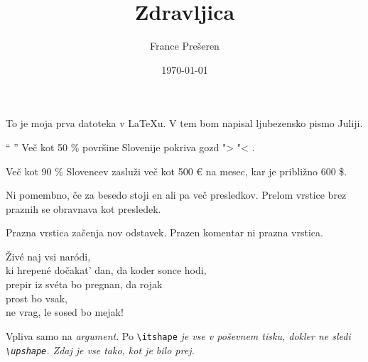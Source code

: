 \documentclass[12pt]{article}
\author{France Prešeren}
\title{Zdravljica}
\date{\today}
\begin{document}
  \maketitle
  To je moja prva datoteka v LaTeXu. V tem bom napisal ljubezensko pismo Juliji.
  
  \vspace{2cm}

  "` "' Več kot 50 \% površine Slovenije pokriva gozd "> "< .

  \glqq \grqq

  \vspace{2cm}


  Več kot 90 \% Slovencev zasluži več kot 500 € na mesec, kar je približno 600 \$.

  \vspace{2cm}

  Ni pomembno, če za besedo
  stoji en ali pa več           presledkov.
  Prelom vrstice brez praznih 
        se obravnava kot presledek.


  Prazna vrstica začenja nov odstavek. 
  Prazen komentar ni prazna vrstica.

\clearpage

\noindent Živé naj vsi naródi,\\
ki hrepené dočakat' dan,\newline
da koder sonce hodi,\\
prepir iz svéta bo pregnan,\newline
da rojak\\
prost bo vsak,\\
ne vrag, le sosed bo mejak!

\vspace{2cm}
Vpliva samo na \textit{argument}.
Po \texttt{\textbackslash itshape} \itshape
je vse v poševnem tisku,
dokler ne sledi  \upshape \texttt{\textbackslash upshape}.
Zdaj je vse tako, kot je bilo prej.



\vspace{2cm}
\end{document}
